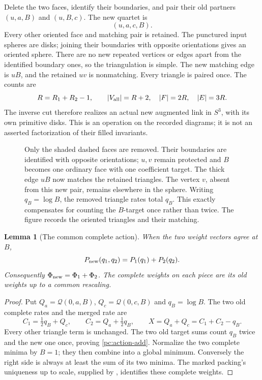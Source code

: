 \documentclass[11pt]{article}
\numberwithin{equation}{section}
\newtheorem{lemma}[theorem]{Lemma}
\theoremstyle{definition}\newtheorem{definition}[theorem]{Definition}
\theoremstyle{remark}\newtheorem{remark}[theorem]{Remark}
\newcommand{\calQ}{\mathcal Q}
\begin{document}
Delete the two faces, identify their boundaries, and pair their old
partners \((u,a,B)\) and \((u,B,c)\). The new quartet is
\begin{equation}\label{pc:new-pair}
                              (u,a,c,B).
\end{equation}
Every other oriented face and matching pair is retained.
The punctured input spheres are disks; joining their boundaries
with opposite orientations gives an oriented sphere. There are no
new repeated vertices or edges apart from the identified boundary
ones, so the triangulation is simple. The new matching edge is
\(uB\), and the retained \(uv\) is nonmatching. Every triangle is
paired once. The counts are
\begin{equation}\label{pc:counts}
 R=R_1+R_2-1,\qquad |V_{\rm all}|=R+2,\quad
                         |F|=2R,\quad |E|=3R.
\end{equation}
The inverse cut therefore realizes an actual new augmented link
in \(S^3\), with its own primitive disks. This is an operation on
the recorded diagrams; it is not an asserted factorization of their
filled invariants.

\begin{figure}[htbp]
\centering

\caption{Only the shaded dashed faces are removed. Their boundaries
are identified with opposite orientations; \(u,v\) remain protected
and \(B\) becomes one ordinary face with one coefficient target.
The thick edge \(uB\) now matches the retained triangles. The vertex
\(v\), absent from this new pair, remains elsewhere in the sphere.
Writing \(q_B=\log B\), the removed triangle rates total \(q_B\).
This exactly compensates for counting the \(B\)-target once rather
than twice. The figure records the oriented triangles and their matching.}
\label{pc:gluing-figure}
\end{figure}

\begin{lemma}[The common complete action]\label{pc:action-sum}
When the two weight vectors agree at \(B\),
\begin{equation}\label{pc:action-add}
                   P_{\rm new}(q_1,q_2)=P_1(q_1)+P_2(q_2).
\end{equation}
Consequently \(\Phi_{\rm new}=\Phi_1+\Phi_2\). The complete
weights on each piece are its old weights up to a common rescaling.
\end{lemma}
\begin{proof}
Put \(Q_a=\calQ(0,a,B)\), \(Q_c=\calQ(0,c,B)\) and \(q_B=\log B\).
The two old complete rates and the merged rate are
\[
 C_1=\tfrac12q_B+Q_c,\qquad
 C_2=Q_a+\tfrac12q_B,\qquad X=Q_a+Q_c=C_1+C_2-q_B.
\]
Every other triangle term is unchanged. The two old target sums
count \(q_B\) twice and the new one once, proving
\eqref{pc:action-add}. Normalize the two complete minima by \(B=1\);
they then combine into a global minimum. Conversely the right
side is always at least the sum of its two minima. The marked
packing's uniqueness up to scale, supplied by \cite[Section 3]{Geometry},
identifies these complete weights.
\end{proof}
\end{document}
